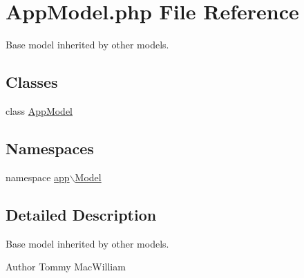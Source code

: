\hypertarget{AppModel_8php}{
\section{\-App\-Model.php \-File \-Reference}
\label{AppModel_8php}
}


\-Base model inherited by other models.  


\subsection*{\-Classes}
\begin{DoxyCompactItemize}
\item 
class \hyperlink{classAppModel}{\-App\-Model}
\end{DoxyCompactItemize}
\subsection*{\-Namespaces}
\begin{DoxyCompactItemize}
\item 
namespace \hyperlink{namespaceapp_1_1Model}{app$\backslash$\-Model}
\end{DoxyCompactItemize}


\subsection{\-Detailed \-Description}
\-Base model inherited by other models. \begin{DoxyAuthor}{\-Author}
\-Tommy \-Mac\-William 
\end{DoxyAuthor}
